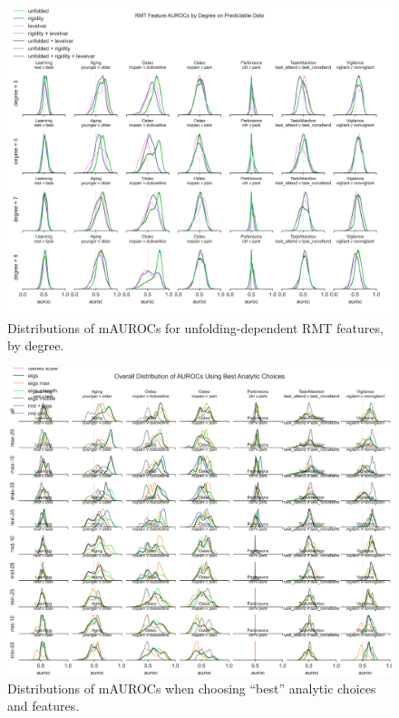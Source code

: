 \documentclass{article}  %
\begin{document}
\begin{figure}[H]
\begin{center}
\includegraphics[width=\textwidth,height=0.9\textheight,keepaspectratio]{rmt_feature_auroc_by_degree.png}
\end{center}
\caption
{ \label{fig:fine-degree}
Distributions of mAUROCs for unfolding-dependent RMT features, by degree.}
\end{figure}



\begin{figure}[H]
\begin{center}
\includegraphics[width=\textwidth,height=0.9\textheight,keepaspectratio]{best_rmt_params_by_subgroup.png}
\end{center}
\caption
{ \label{fig:best-params}
Distributions of mAUROCs when choosing ``best'' analytic choices and features.}
\end{figure}
\end{document}
